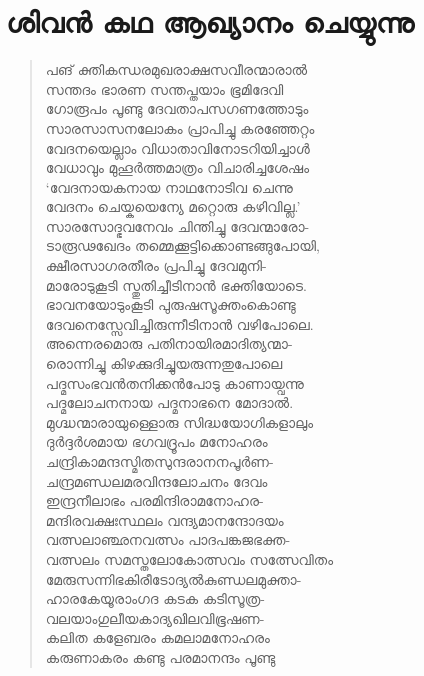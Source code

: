 \section{ശിവന്‍ കഥ ആഖ്യാനം ചെയ്യുന്നു}

\begin{verse}
പങ് ക്തികന്ധരമുഖരാക്ഷസവീരന്മാരാല്‍\\
സന്തദം ഭാരണ സന്തപ്തയാം ഭൂമിദേവി\\
ഗോരൂപം പൂണ്ടു ദേവതാപസഗണത്തോടും\\
സാരസാസനലോകം പ്രാപിച്ചു കരഞ്ഞേറ്റം\\
വേദനയെല്ലാം വിധാതാവിനോടറിയിച്ചാള്‍\\
വേധാവും മുഹൂര്‍ത്തമാത്രം വിചാരിച്ചശേഷം\\
‘വേദനായകനായ നാഥനോടിവ ചെന്നു\\
വേദനം ചെയ്കയെന്യേ മറ്റൊരു കഴിവില്ല.’\\
സാരസോദ്ഭവനേവം ചിന്തിച്ചു ദേവന്മാരോ-\\
ടാരൂഢഖേദം തമ്മെക്കൂട്ടിക്കൊണ്ടങ്ങുപോയി,\\
ക്ഷീരസാഗരതീരം പ്രപിച്ചു ദേവമുനി-\\
മാരോടുകൂടി സ്തുതിച്ചീടിനാന്‍ ഭക്തിയോടെ.\\
ഭാവനയോടുംകൂടി പുരുഷസൂക്തംകൊണ്ടു\\
ദേവനെസ്സേവിച്ചിരുന്നീടിനാന്‍ വഴിപോലെ.\\
അന്നെരമൊരു പതിനായിരമാദിത്യന്മാ-\\
രൊന്നിച്ചു കിഴക്കുദിച്ചുയരുന്നതുപോലെ\\
പദ്മസംഭവന്‍തനിക്കന്‍പോടു കാണായ്വന്നു\\
പദ്മലോചനനായ പദ്മനാഭനെ മോദാല്‍.\\
മുഗ്ദ്ധന്മാരായുള്ളൊരു സിദ്ധയോഗികളാലും\\
ദുര്‍ദ്ദര്‍ശമായ ഭഗവദ്രൂപം മനോഹരം\\
ചന്ദ്രികാമന്ദസ്മിതസുന്ദരാനനപൂര്‍ണ-\\
ചന്ദ്രമണ്ഡലമരവിന്ദലോചനം ദേവം\\
ഇന്ദ്രനീലാഭം പരമിന്ദിരാമനോഹര-\\
മന്ദിരവക്ഷഃസ്ഥലം വന്ദ്യമാനന്ദോദയം\\
വത്സലാഞ്ഛനവത്സം പാദപങ്കജഭക്ത-\\
വത്സലം സമസ്തലോകോത്സവം സത്സേവിതം\\
മേരുസന്നിഭകിരീടോദ്യല്‍കുണ്ഡലമുക്താ-\\
ഹാരകേയൂരാംഗദ കടക കടിസൂത്ര-\\
വലയാംഗുലീയകാദ്യഖിലവിഭൂഷണ-\\
കലിത കളേബരം കമലാമനോഹരം\\
കരുണാകരം കണ്ടു പരമാനന്ദം പൂണ്ടു\\

\end{verse}
